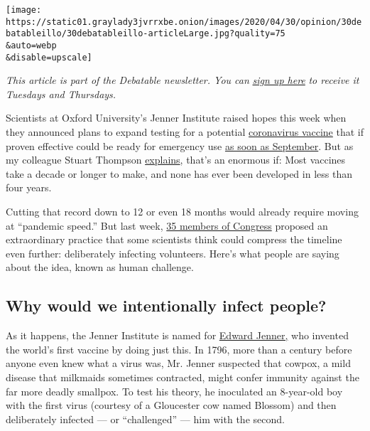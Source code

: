 \texttt{[image: https://static01.graylady3jvrrxbe.onion/images/2020/04/30/opinion/30debatableillo/30debatableillo-articleLarge.jpg?quality=75\\\&auto=webp\\\&disable=upscale]}

\emph{This article is part of the Debatable newsletter. You can}
\href{https://www.nytimes3xbfgragh.onion/newsletters/debatable}{\emph{sign
up here}} \emph{to receive it Tuesdays and Thursdays.}

Scientists at Oxford University's Jenner Institute raised hopes this
week when they announced plans to expand testing for a potential
\href{https://www.nytimes3xbfgragh.onion/2020/05/20/health/coronavirus-vaccines.html}{coronavirus
vaccine} that if proven effective could be ready for emergency use
\href{https://www.nytimes3xbfgragh.onion/2020/04/27/world/europe/coronavirus-vaccine-update-oxford.html}{as
soon as September}. But as my colleague Stuart Thompson
\href{https://www.nytimes3xbfgragh.onion/interactive/2020/04/30/opinion/coronavirus-covid-vaccine.html}{explains},
that's an enormous if: Most vaccines take a decade or longer to make,
and none has ever been developed in less than four years.

Cutting that record down to 12 or even 18 months would already require
moving at ``pandemic speed.'' But last week,
\href{https://foster.house.gov/sites/foster.house.gov/files/2020.04.20_Ltr\%20to\%20HHS\%20\%20FDA\%20on\%20Rapid\%20Vaccine\%20Deployment\%20for\%20COVID-19\%20-\%20Signed.pdf}{35
members of Congress} proposed an extraordinary practice that some
scientists think could compress the timeline even further: deliberately
infecting volunteers. Here's what people are saying about the idea,
known as human challenge.

\hypertarget{why-would-we-intentionally-infect-people}{%
\subsection{Why would we intentionally infect
people?}\label{why-would-we-intentionally-infect-people}}

As it happens, the Jenner Institute is named for
\href{https://www.jenner.ac.uk/about/edward-jenner}{Edward Jenner,} who
invented the world's first vaccine by doing just this. In 1796, more
than a century before anyone even knew what a virus was, Mr. Jenner
suspected that cowpox, a mild disease that milkmaids sometimes
contracted, might confer immunity against the far more deadly smallpox.
To test his theory, he inoculated an 8-year-old boy with the first virus
(courtesy of a Gloucester cow named Blossom) and then deliberately
infected --- or ``challenged'' --- him with the second.

